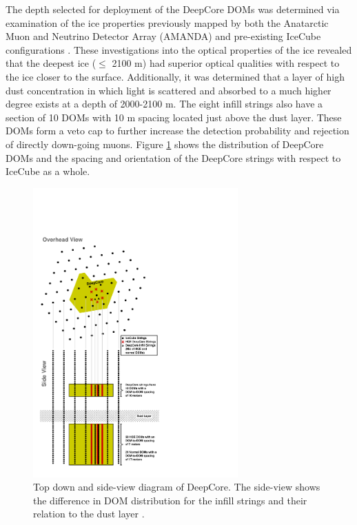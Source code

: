 \documentclass{gatech-thesis}
\begin{document}
The depth selected for deployment of the DeepCore DOMs was determined via examination of the ice properties previously mapped by both the Anatarctic Muon and Neutrino Detector Array (AMANDA) \cite{2006JGRD..11113203A} and pre-existing IceCube configurations \cite{2013JGlac..59.1117.}. These investigations into the optical properties of the ice revealed that the deepest ice ($\leq$ 2100 m) had superior optical qualities with respect to the ice closer to the surface. Additionally, it was determined that a layer of high dust concentration in which light is scattered and absorbed to a much higher degree exists at a depth of 2000-2100 m. The eight infill strings also have a section of 10 DOMs with 10 m spacing located just above the dust layer. These DOMs form a veto cap to further increase the detection probability and rejection of directly down-going muons. Figure \ref{fig:DeepCoreSchematic} shows the distribution of DeepCore DOMs and the spacing and orientation of the DeepCore strings with respect to IceCube as a whole.

\begin{figure}[ht]
  \begin{center}
    \includegraphics[width=0.7\textwidth,keepaspectratio]{IC86EDC_DeepCoreDiagram.pdf}
  \end{center}
  \caption{Top down and side-view diagram of DeepCore. The side-view shows the difference in DOM distribution for the infill strings and their relation to the dust layer \cite{2012APh....35..615A}.}
  \label{fig:DeepCoreSchematic}
\end{figure}
\end{document}
